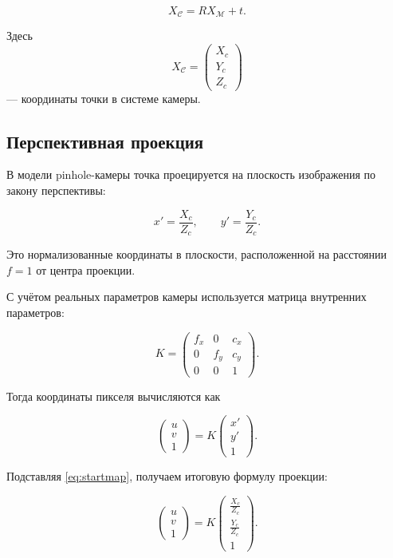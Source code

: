 \documentclass[a4paper,12pt]{article}
\begin{document}
\begin{equation}
X_{\mathcal{C}} = R X_{\mathcal{M}} + t.
\label{eq:xcxm}
\end{equation}

Здесь
\[
X_{\mathcal{C}} =
\begin{pmatrix}
X_c \\
Y_c \\
Z_c
\end{pmatrix}
\]
--- координаты точки в системе камеры.

\subsection*{Перспективная проекция}

В модели pinhole-камеры точка проецируется на плоскость изображения по закону перспективы:

\begin{equation}
x' = \frac{X_c}{Z_c}, \qquad
y' = \frac{Y_c}{Z_c}.
\label{eq:startmap}
\end{equation}

Это нормализованные координаты в плоскости, расположенной на расстоянии $f=1$ от центра проекции.

С учётом реальных параметров камеры используется матрица внутренних параметров:

\begin{equation}
K =
\begin{pmatrix}
f_x & 0 & c_x \\
0 & f_y & c_y \\
0 & 0 & 1
\end{pmatrix}.
\end{equation}

Тогда координаты пикселя вычисляются как

\begin{equation}
\begin{pmatrix}
u \\
v \\
1
\end{pmatrix}
=
K
\begin{pmatrix}
x' \\
y' \\
1
\end{pmatrix}.
\end{equation}

Подставляя \eqref{eq:startmap}, получаем итоговую формулу проекции:

\begin{equation}
\begin{pmatrix}
u \\
v \\
1
\end{pmatrix}
=
K
\begin{pmatrix}
\frac{X_c}{Z_c} \\
\frac{Y_c}{Z_c} \\
1
\end{pmatrix}.
\label{eq:fullproj}
\end{equation}
\end{document}
